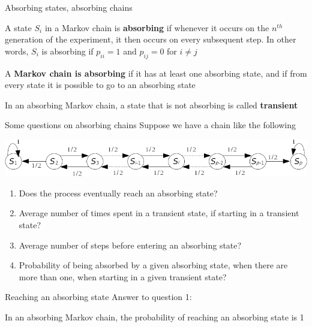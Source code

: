 \documentclass[aspectratio=43]{beamer}
\begin{document}
\begin{frame}{Absorbing states, absorbing chains}
    \begin{definition}
        A state $S_i$ in a Markov chain is \textbf{absorbing} if whenever it occurs on the $n^{th}$ generation of the experiment, it then occurs on every subsequent step. In other words, $S_i$ is absorbing if $p_{ii}=1$ and $p_{ij}=0$ for $i\neq j$
    \end{definition}
    \begin{definition}
        A \textbf{Markov chain is absorbing} if it has at least one absorbing state, and if from every state it is possible to go to an absorbing state
    \end{definition}
    \begin{definition}
        In an absorbing Markov chain, a state that is not absorbing is called \textbf{transient}
    \end{definition}
\end{frame}

\begin{frame}{Some questions on absorbing chains}
    Suppose we have a chain like the following
    \begin{center}
        \includegraphics[width=\textwidth]{FIGS/drunk_mans_walk_absorbing}
    \end{center}
    \begin{enumerate}
        \item Does the process eventually reach an absorbing state?
        \item Average number of times spent in a transient state, if starting in a transient state?
        \item Average number of steps before entering an absorbing state?
        \item Probability of being absorbed by a given absorbing state, when there are more than one, when starting in a given transient state?
    \end{enumerate}
\end{frame}



\begin{frame}{Reaching an absorbing state}
    Answer to question 1:
    \begin{theorem}
        In an absorbing Markov chain, the probability of reaching an absorbing state is 1
    \end{theorem}
\end{frame}
\end{document}
